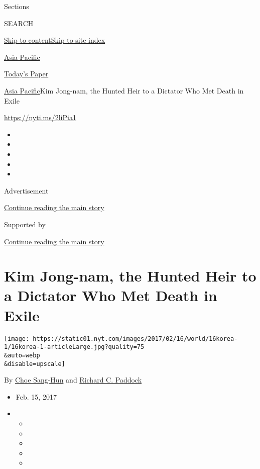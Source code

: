 Sections

SEARCH

\protect\hyperlink{site-content}{Skip to
content}\protect\hyperlink{site-index}{Skip to site index}

\href{https://www.nytimes.com/section/world/asia}{Asia Pacific}

\href{https://myaccount.nytimes.com/auth/login?response_type=cookie\&client_id=vi}{}

\href{https://www.nytimes.com/section/todayspaper}{Today's Paper}

\href{/section/world/asia}{Asia Pacific}\textbar{}Kim Jong-nam, the
Hunted Heir to a Dictator Who Met Death in Exile

\url{https://nyti.ms/2liPia1}

\begin{itemize}
\item
\item
\item
\item
\item
\end{itemize}

Advertisement

\protect\hyperlink{after-top}{Continue reading the main story}

Supported by

\protect\hyperlink{after-sponsor}{Continue reading the main story}

\hypertarget{kim-jong-nam-the-hunted-heir-to-a-dictator-who-met-death-in-exile}{%
\section{Kim Jong-nam, the Hunted Heir to a Dictator Who Met Death in
Exile}\label{kim-jong-nam-the-hunted-heir-to-a-dictator-who-met-death-in-exile}}

\texttt{[image: https://static01.nyt.com/images/2017/02/16/world/16korea-1/16korea-1-articleLarge.jpg?quality=75\\\&auto=webp\\\&disable=upscale]}

By \href{http://www.nytimes.com/by/choe-sang-hun}{Choe Sang-Hun} and
\href{https://www.nytimes.com/by/richard-c-paddock}{Richard C. Paddock}

\begin{itemize}
\item
  Feb. 15, 2017
\item
  \begin{itemize}
  \item
  \item
  \item
  \item
  \item
  \end{itemize}
\end{itemize}


